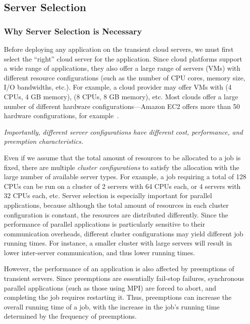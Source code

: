 \subsection{Server Selection}
\label{subsec:server-selection}

\subsubsection{Why Server Selection is Necessary}

Before deploying any application on the transient cloud servers, we must first select the ``right'' cloud server for the application. 
Since cloud platforms support a wide range of applications, they also offer a large range of servers (VMs) with different resource configurations (such as the number of CPU cores, memory size, I/O bandwidths, etc.). 
For example, a cloud provider may offer VMs with (4 CPUs, 4 GB memory), (8 CPUs, 8 GB memory), etc.
Most clouds offer a large number of different hardware configurations---Amazon EC2 offers more than 50 hardware configurations, for example~\cite{amazon-ec2-instance-types}. 

\noindent \emph{Importantly, different server configurations have different cost, performance, and preemption characteristics. }


Even if we assume that the total amount of resources to be allocated to a job is fixed, there are multiple \emph{cluster configurations} to satisfy the allocation with the large number of available server types. 
For example, a job requiring a total of 128 CPUs can be run on a cluster of 2 servers with 64 CPUs each, or 4 servers with 32 CPUs each, etc. 
Server selection is especially important for parallel applications, because although the total amount of resources in each cluster configuration is constant, the resources are distributed differently. 
Since the performance of parallel applications is particularly sensitive to their communication overheads, different cluster configurations may yield different job running times.
For instance, a smaller cluster with large servers will result in lower inter-server communication, and thus lower running times. 

However, the performance of an application is also affected by preemptions of transient servers.
Since preemptions are essentially fail-stop failures, synchronous parallel applications (such as those using MPI) are forced to abort, and completing the job requires restarting it.
Thus, preemptions can increase the overall running time of a job, with the increase in the job's running time determined by the frequency of preemptions.


